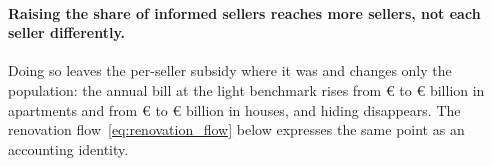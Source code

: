 \paragraph{Raising the share of informed sellers reaches more sellers, not each seller differently.}
Doing so leaves the per-seller subsidy where it was and changes only the population: the annual bill at the light benchmark rises from \euro{}\attScBaseCostTwoFiftyApt{} to \euro{}\attScPiOneCostTwoFiftyApt{} billion in apartments and from \euro{}\attScBaseCostTwoFiftyHouse{} to \euro{}\attScPiOneCostTwoFiftyHouse{} billion in houses, and hiding disappears. The renovation flow~\eqref{eq:renovation_flow} below expresses the same point as an accounting identity.
